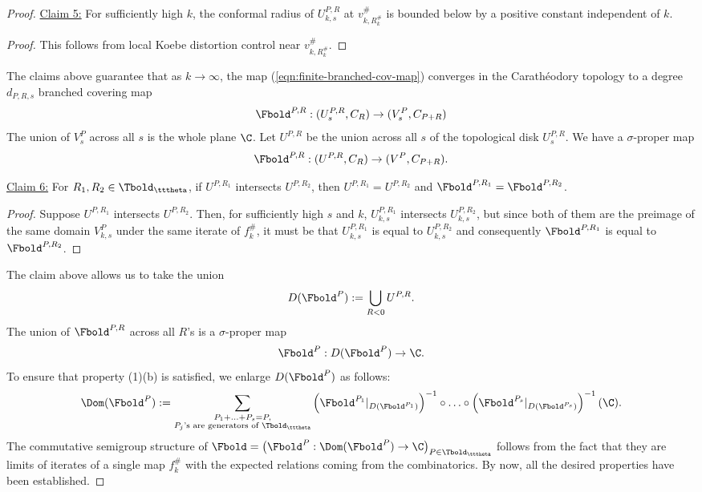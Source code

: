 \documentclass{amsart}
\begin{document}
\begin{proof}
    \noindent\underline{Claim 5:} For sufficiently high $k$, the conformal radius of $ U^{P,R}_{k,s}$ at $v^{\#}_{k,R_k^{\#}}$ is bounded below by a positive constant independent of $k$.

    \begin{proof}
        This follows from local Koebe distortion control near $v^{\#}_{k,R_k^{\#}}$.
    \end{proof}

    The claims above guarantee that as $k \to \infty$, the map (\ref{eqn:finite-branched-cov-map}) converges in the Carath\'eodory topology to a degree $d_{P,R,s}$ branched covering map
        \[
            \Fbold^{P,R} : (U^{P,R}_s, C_R) \to (V^P_s, C_{P+R})
        \]
    The union of $V^{P}_s$ across all $s$ is the whole plane $\C$.
    Let $U^{P,R}$ be the union across all $s$ of the topological disk $U^{P,R}_s$.
    We have a $\sigma$-proper map
    \[
        \Fbold^{P,R} : (U^{P,R}, C_R) \to (V^P, C_{P+R}).
    \]
    
    \vspace{0.1in}
    
    \noindent\underline{Claim 6:} For $R_1, R_2 \in \Tbold_{\tttheta}$, if $U^{P,R_1}$ intersects $U^{P,R_2}$, then $U^{P,R_1} = U^{P,R_2}$ and $\Fbold^{P,R_1} = \Fbold^{P,R_2}$.

    \begin{proof}
        Suppose $U^{P,R_1}$ intersects $U^{P,R_2}$. 
        Then, for sufficiently high $s$ and $k$, $U^{P,R_1}_{k,s}$ intersects $U^{P,R_2}_{k,s}$, but since both of them are the preimage of the same domain $V^P_{k,s}$ under the same iterate of $f_k^{\#}$, it must be that $U^{P,R_1}_{k,s}$ is equal to $U^{P,R_2}_{k,s}$ and consequently $\Fbold^{P,R_1}$ is equal to $\Fbold^{P,R_2}$.
    \end{proof}
    
    The claim above allows us to take the union
        \[
            D(\Fbold^P) := \bigcup_{R <0} U^{P,R}.
        \]
    The union of $\Fbold^{P,R}$ across all $R$'s is a $\sigma$-proper map
        \[
            \Fbold^{P} : D(\Fbold^P) \to \C.
        \]
    To ensure that property (1)(b) is satisfied, we enlarge $D(\Fbold^P)$ as follows:
        \[
            \Dom(\Fbold^P) := \sum_{\substack{P_1 + \ldots + P_s = P, \\ P_j\textnormal{'s are generators of } \Tbold_{\tttheta}}} 
            \left( \Fbold^{P_1}|_{D(\Fbold^{P_1})} \right)^{-1} \circ 
            \ldots \circ
            \left( \Fbold^{P_s}|_{D(\Fbold^{P_s})} \right)^{-1}
            (\C).
        \]
    The commutative semigroup structure of $\Fbold = \big(\Fbold^P: \Dom(\Fbold^P) \to \C \big)_{P \in \Tbold_{\tttheta}}$ follows from the fact that they are limits of iterates of a single map $f_k^{\#}$ with the expected relations coming from the combinatorics.
    By now, all the desired properties have been established.
\end{proof}
\end{document}
